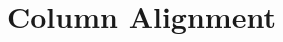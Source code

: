 \begin{comment}
\vspace{0.1cm}
\noindent{\bf Definition [Type Agreement].}
Given two entities $e_i$ and $e_j$, their agreement is computed from their
most specific common type $t$ as follows:
\[
\textit{agree}(e_i, e_j) = \max\big(\textit{itp}(t)\ |\ t \in \textit{types}(e_i) \cap \textit{types}(e_j)\big)
\]
\noindent where $\textit{types}(e_i)$ is the set of all types for $e_i$ obtained from the KB 
(using YAGO, {\small\tt yago-knowledge.org}, as it has an expressive type system) 
and $\textit{itp(t)}$ (\textit{inverse type population}) denotes the specificity of $t$, 
defined as:
$$\textit{itp}(t) = \log_{10}\bigg(\frac{\#\textit{total\_kb\_entities - \#\textit{entities\_with\_type\_t} ~+~ 0.5}}{\#\textit{entities\_with\_type\_t} ~+~ 0.5}\bigg)$$

\noindent \textit{itp} is analogous to \textit{inverse document frequency (idf)}. Types with a low number of entities in the KB are most informative.
%
%
We treat
the type agreement between a pair of same-column cells
as another factor that is included into 
the collective inference.
\end{comment}


\section{Column Alignment}
\label{sec:columnalignment}



